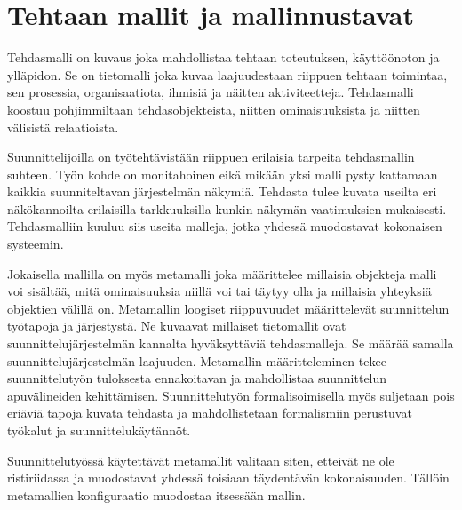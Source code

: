 \documentclass[finnish,12pt]{article}
\begin{document}
	\clearpage
	\section{Tehtaan mallit ja mallinnustavat}

Tehdasmalli on kuvaus joka mahdollistaa tehtaan toteutuksen, käyttöönoton ja ylläpidon. Se on tietomalli joka kuvaa laajuudestaan riippuen tehtaan toimintaa, sen prosessia, organisaatiota, ihmisiä ja näitten aktiviteetteja. Tehdasmalli koostuu pohjimmiltaan tehdasobjekteista, niitten ominaisuuksista ja niitten välisistä relaatioista.

Suunnittelijoilla on työtehtävistään riippuen erilaisia tarpeita tehdasmallin suhteen. Työn kohde on monitahoinen eikä mikään yksi malli pysty kattamaan kaikkia suunniteltavan järjestelmän näkymiä. Tehdasta tulee kuvata useilta eri näkökannoilta erilaisilla tarkkuuksilla kunkin näkymän vaatimuksien mukaisesti. Tehdasmalliin kuuluu siis useita malleja, jotka yhdessä muodostavat kokonaisen systeemin.

Jokaisella mallilla on myös metamalli joka määrittelee millaisia objekteja malli voi sisältää, mitä ominaisuuksia niillä voi tai täytyy olla ja millaisia yhteyksiä objektien välillä on. Metamallin loogiset riippuvuudet määrittelevät suunnittelun työtapoja ja järjestystä. Ne kuvaavat millaiset tietomallit ovat suunnittelujärjestelmän kannalta hyväksyttäviä tehdasmalleja. Se määrää samalla suunnittelujärjestelmän laajuuden. Metamallin määritteleminen tekee suunnittelutyön tuloksesta ennakoitavan ja mahdollistaa suunnittelun apuvälineiden kehittämisen. Suunnittelutyön formalisoimisella myös suljetaan pois eriäviä tapoja kuvata tehdasta ja mahdollistetaan formalismiin perustuvat työkalut ja suunnittelukäytännöt. 

Suunnittelutyössä käytettävät metamallit valitaan siten, etteivät ne ole ristiriidassa ja muodostavat yhdessä toisiaan täydentävän kokonaisuuden. Tällöin metamallien konfiguraatio muodostaa itsessään mallin.



\end{document}
